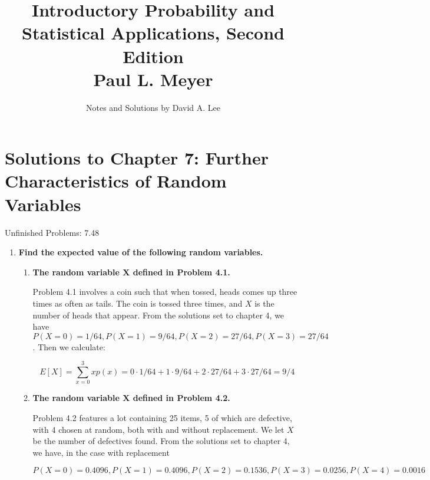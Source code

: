 \documentclass[10pt, oneside]{article}   	%
\title{Introductory Probability and Statistical Applications, Second Edition \\
\large{Paul L. Meyer}}
\author{Notes and Solutions by David A. Lee}
\date{}							%
\theoremstyle{definition}
\begin{document}
\maketitle
\section*{Solutions to Chapter 7: Further Characteristics of Random Variables}

Unfinished Problems: 7.48

\begin{enumerate}[label=7.\arabic*]
\itemsep0em 
\item  \begin{tcolorbox}[
  colback=Cerulean!5!white,
  colframe=Cerulean!75!black]
\textbf{Find the expected value of the following random variables.}
\end{tcolorbox}

	\begin{enumerate}
	\item  \begin{tcolorbox}[
	  colback=Cerulean!5!white,
	  colframe=Cerulean!75!black]
	\textbf{The random variable $\bm{X}$ defined in Problem 4.1.}
	\end{tcolorbox}
	
	Problem 4.1 involves a coin such that when tossed, heads comes up three times as often as tails. The coin is tossed three times, and $X$ is the number of heads that appear. From the solutions set to chapter 4, we have $P(X = 0) = 1/64, P(X = 1) = 9/64, P(X = 2) = 27/64, P(X = 3) = 27/64$. Then we calculate:
	
	\[ E[X] = \sum^3_{x=0} xp(x) = 0 \cdot 1/64 + 1 \cdot 9/64 + 2 \cdot 27/64 + 3 \cdot 27/64 = \boxed{9/4} \]
	
	\item  \begin{tcolorbox}[
	  colback=Cerulean!5!white,
	  colframe=Cerulean!75!black]
	\textbf{The random variable $\bm{X}$ defined in Problem 4.2.}
	\end{tcolorbox}
	
	Problem 4.2 features a lot containing 25 items, 5 of which are defective, with 4 chosen at random, both with and without replacement. We let $X$ be the number of defectives found. From the solutions set to chapter 4, we have, in the case with replacement
	
	 \[ P(X=0) = 0.4096, P(X = 1) = 0.4096, P(X = 2) = 0.1536, P(X = 3) = 0.0256, P(X = 4) = 0.0016 \]
	 

\end{enumerate}
\end{enumerate}
\end{document}
